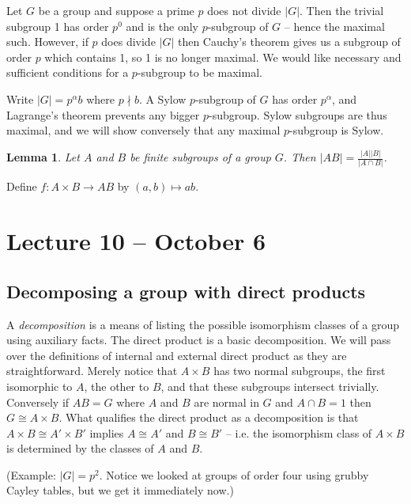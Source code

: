 \documentclass[letterpaper]{article}
\newtheorem{lemma}[theorem]{Lemma}
\newenvironment{proof}[1][Proof]{\begin{trivlist}
\item[\hskip \labelsep {\bfseries #1}]}{\end{trivlist}}
\begin{document}
Let $G$ be a group and suppose a prime $p$ does not divide $|G|$. Then the trivial subgroup 1 has order $p^0$ and is the only $p$-subgroup of $G$ -- hence the maximal such. However, if $p$ does divide $|G|$ then Cauchy's theorem gives us a subgroup of order $p$ which contains 1, so 1 is no longer maximal. We would like necessary and sufficient conditions for a $p$-subgroup to be maximal.

Write $|G| = p^\alpha b$ where $p \nmid b$. A Sylow $p$-subgroup of $G$ has order $p^\alpha$, and Lagrange's theorem prevents any bigger $p$-subgroup. Sylow subgroups are thus maximal, and we will show conversely that any maximal $p$-subgroup is Sylow.

\begin{lemma}
Let $A$ and $B$ be finite subgroups of a group $G$. Then $|AB|= \frac{|A||B|}{|A \cap B|}$.
\end{lemma}
\begin{proof}
Define $f \colon A \times B \rightarrow AB$ by $(a,b) \mapsto ab$.

\end{proof}

\section{Lecture 10 -- October 6}

\subsection{Decomposing a group with direct products}

A \emph{decomposition} is a means of listing the possible isomorphism classes of a group using auxiliary facts. The direct product is a basic decomposition. We will pass over the definitions of internal and external direct product as they are straightforward. Merely notice that $A \times B$ has two normal subgroups, the first isomorphic to $A$, the other to $B$, and that these subgroups intersect trivially. Conversely if $AB = G$ where $A$ and $B$ are normal in $G$ and $A \cap B = 1$ then $G \cong A \times B$. What qualifies the direct product as a decomposition is that $A \times B \cong A' \times B'$ implies $A \cong A'$ and $B \cong B'$ -- i.e. the isomorphism class of $A \times B$ is determined by the classes of $A$ and $B$.

(Example: $|G| = p^2$. Notice we looked at groups of order four using grubby Cayley tables, but we get it immediately now.)
\end{document}
